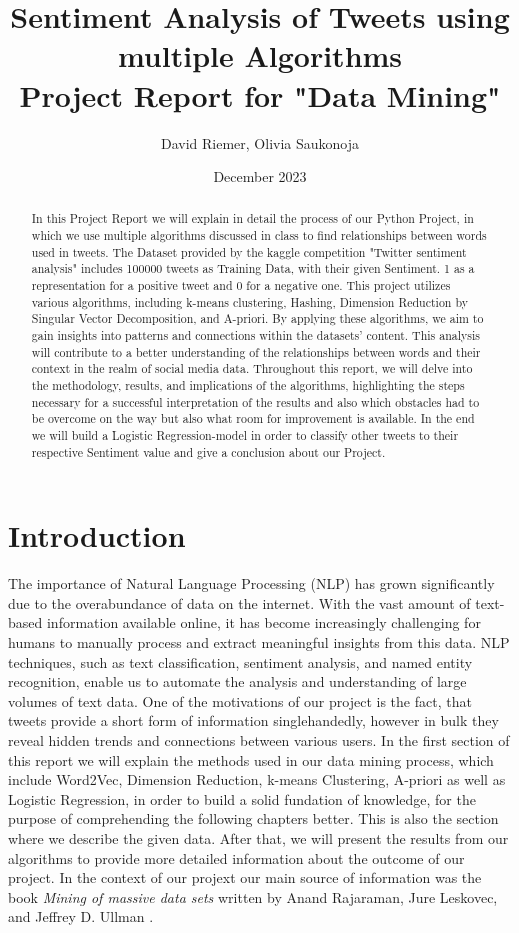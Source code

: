\documentclass[11pt,a4paper]{article}
\title{Sentiment Analysis of Tweets using multiple Algorithms \\[0.5em] \large{Project Report for "Data Mining" \\[0.5em]} }
\author{David Riemer, Olivia Saukonoja}
\date{December 2023}
\begin{document}
\maketitle


\newpage
\begin{abstract}
In this Project Report we will explain in detail the process of our Python Project, in which we use multiple algorithms discussed in class to find relationships between words used in tweets. The Dataset provided by the kaggle competition "Twitter sentiment analysis" includes 100000 tweets as Training Data, with their given Sentiment. 1 as a representation for a positive tweet and 0 for a negative one.
This project utilizes various algorithms, including k-means clustering, Hashing, Dimension Reduction by Singular Vector Decomposition, and A-priori. By applying these algorithms, we aim to gain insights into patterns and connections within the datasets' content. 
This analysis will contribute to a better understanding of the relationships between words and their context in the realm of social media data. 
Throughout this report, we will delve into the methodology, results, and implications of the algorithms, highlighting the steps necessary for a successful interpretation of the results and also which obstacles had to be overcome on the way but also what room for improvement is available.
In the end we will build a Logistic Regression-model in order to classify other tweets to their respective Sentiment value and give a conclusion about our Project.
\end{abstract}
\newpage
\tableofcontents
\newpage
\section{Introduction}
The importance of Natural Language Processing (NLP) has grown significantly due to the overabundance of data on the internet. With the vast amount of text-based information available online, it has become increasingly challenging for humans to manually process and extract meaningful insights from this data. NLP techniques, such as text classification, sentiment analysis, and named entity recognition, enable us to automate the analysis and understanding of large volumes of text data. 
One of the motivations of our project is the fact, that tweets provide a short form of information singlehandedly, however in bulk they reveal hidden trends and connections between various users. 
In the first section of this report we will explain the methods used in our data mining process, which include Word2Vec, Dimension Reduction, k-means Clustering, A-priori as well as Logistic Regression, in order to build a solid fundation of knowledge, for the purpose of comprehending the following chapters better. This is also the section where we describe the given data. After that, we will present the results from our algorithms to provide more detailed information about the outcome of our project.
In the context of our projext our main source of information was the book \emph{Mining of massive data sets} written by Anand Rajaraman, Jure Leskovec, and Jeffrey D. Ullman \cite{leskovec2020mining}.
\end{document}
